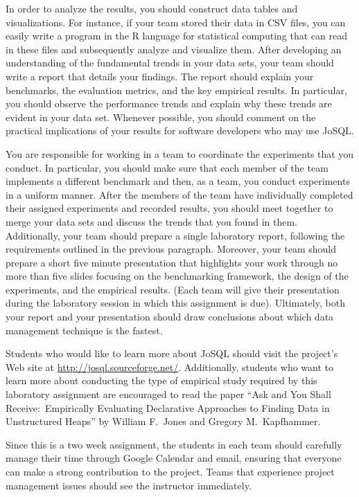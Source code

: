In order to analyze the results, you should construct data tables and visualizations.  For instance, if your team stored
their data in CSV files, you can easily write a program in the R language for statistical computing that can read in
these files and subsequently analyze and visualize them. After developing an understanding of the fundamental trends in
your data sets, your team should write a report that details your findings.  The report should explain your benchmarks,
the evaluation metrics, and the key empirical results.  In particular, you should observe the performance trends and
explain why these trends are evident in your data set.  Whenever possible, you should comment on the practical
implications of your results for software developers who may use JoSQL.  

You are responsible for working in a team to coordinate the experiments that you conduct.  In particular, you should
make sure that each member of the team implements a different benchmark and then, as a team, you conduct experiments in
a uniform manner.  After the members of the team have individually completed their assigned experiments and recorded
results, you should meet together to merge your data sets and discuss the trends that you found in them.  Additionally,
your team should prepare a single laboratory report, following the requirements outlined in the previous paragraph.
Moreover, your team should prepare a short five minute presentation that highlights your work through no more than five
slides focusing on the benchmarking framework, the design of the experiments, and the empirical results. (Each team will
  give their presentation during the laboratory session in which this assignment is due). Ultimately, both your report and
your presentation should draw conclusions about which data management technique is the fastest.

Students who would like to learn more about JoSQL should visit the project's Web site at
\url{http://josql.sourceforge.net/}. Additionally, students who want to learn more about conducting the type of
empirical study required by this laboratory assignment are encouraged to read the paper ``Ask and You Shall Receive:\
Empirically Evaluating Declarative Approaches to Finding Data in Unstructured Heaps'' by William F.\ Jones and Gregory
M.\ Kapfhammer.

Since this is a two week assignment, the students in each team should carefully manage their time through Google
Calendar and email, ensuring that everyone can make a strong contribution to the project. Teams that experience project
management issues should see the instructor immediately.

